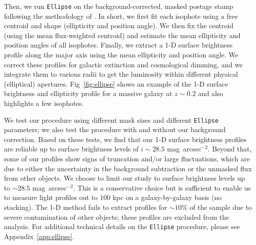 \documentclass[fleqn,usenatbib]{mnras}
\def\sb{mag~arcsec$^{-2}$}
\begin{document}
    Then, we run \texttt{Ellipse} on the background-corrected, masked postage stamp 
    following the methodology of \citet{Li2012}. 
    In short, we first fit each isophote using a free centroid and shape 
    (ellipticity and position angle). 
    We then fix the centroid (using the mean flux-weighted centroid) and estimate
    the mean ellipticity and position angles of all isophotes. 
    Finally, we extract a 1-D surface brightness profile along the major axis using 
    the mean ellipticity and position angle. 
    We correct these profiles for galactic extinction and cosmological dimming, 
    and we integrate them to various radii to get the luminosity 
    within different physical (elliptical) apertures. 
    Fig~\ref{fig:ellipse} shows an example of the 1-D surface brightness and 
    ellipticity profile for a massive galaxy at $z{\sim}0.2$ and also highlights 
    a few isophotes.    

    We test our procedure using different mask sizes and different \texttt{Ellipse} 
    parameters; we also test the procedure with and without our background correction. 
    Based on these tests, we find that our 1-D surface brightness profiles are 
    reliable up to surface brightness levels of $i{\sim}28.5$ \sb. 
    Beyond that, some of our profiles show signs of truncation and/or large 
    fluctuations, which are due to either the uncertainty in the background 
    subtraction or the unmasked flux from other objects.
    We choose to limit our study to surface brightness levels up to ${\sim} 28.5$ \sb. 
    This is a conservative choice but is sufficient to enable us to measure light 
    profiles out to $100$ kpc on a galaxy-by-galaxy basis (no stacking). 
    The 1-D method fails to extract profiles for ${\sim}10$\% of the sample due 
    to severe contamination of other objects; these profiles are excluded from the
    analysis.
    For additional technical details on the \texttt{Ellipse} procedure, please see 
    Appendix~\ref{app:ellipse}.
    
\end{document}
